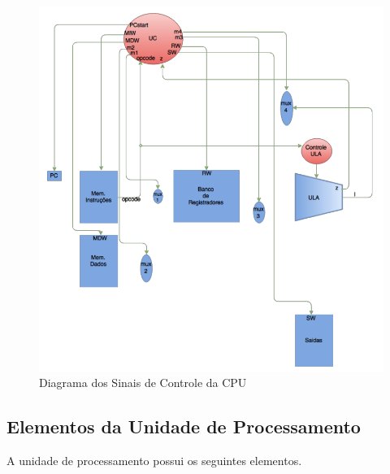 \begin{figure}[!htb]
\begin{center}
\includegraphics[scale=0.7]{figuras/Diagrama_dos_sianais_de_comtrole_da_cpu.jpeg} 
\end{center}
\caption{Diagrama dos Sinais de Controle da CPU}
\end{figure}

\subsection{Elementos da Unidade de Processamento}
A unidade de processamento possui os seguintes elementos.

